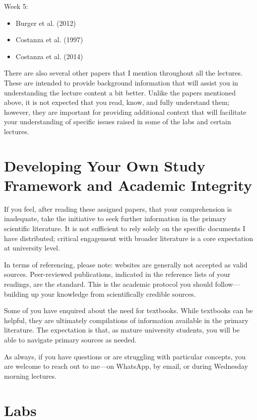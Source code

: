 \documentclass[
  11pt,
]{book}
\providecommand{\tightlist}{%
  \setlength{\itemsep}{0pt}\setlength{\parskip}{0pt}}
\begin{document}
Week 5:

\begin{itemize}
\tightlist
\item
  Burger et al. (2012)
\item
  Costanza et al. (1997)
\item
  Costanza et al. (2014)
\end{itemize}

There are also several other papers that I mention throughout all the
lectures. These are intended to provide background information that will
assist you in understanding the lecture content a bit better. Unlike the
papers mentioned above, it is not expected that you read, know, and
fully understand them; however, they are important for providing
additional context that will facilitate your understanding of specific
issues raised in some of the labs and certain lectures.

\section{Developing Your Own Study Framework and Academic
Integrity}\label{developing-your-own-study-framework-and-academic-integrity}

If you feel, after reading these assigned papers, that your
comprehension is inadequate, take the initiative to seek further
information in the primary scientific literature. It is not sufficient
to rely solely on the specific documents I have distributed; critical
engagement with broader literature is a core expectation at university
level.

In terms of referencing, please note: websites are generally not
accepted as valid sources. Peer-reviewed publications, indicated in the
reference lists of your readings, are the standard. This is the academic
protocol you should follow---building up your knowledge from
scientifically credible sources.

Some of you have enquired about the need for textbooks. While textbooks
can be helpful, they are ultimately compilations of information
available in the primary literature. The expectation is that, as mature
university students, you will be able to navigate primary sources as
needed.

As always, if you have questions or are struggling with particular
concepts, you are welcome to reach out to me---on WhatsApp, by email, or
during Wednesday morning lectures.

\section{Labs}\label{labs}
\end{document}

